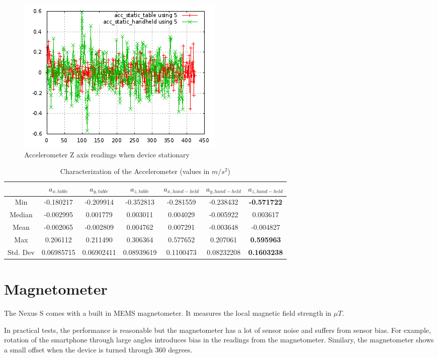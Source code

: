 \begin{figure}\centering
    \includegraphics{figures/accel_static.png}
    \caption{Accelerometer Z axis readings when device stationary\label{fig:accel_static}}
\end{figure}

\begin{table}
\centering
\begin{tabular}{c c c c c c c}
\hline
\hline
 & $a_{x,table}$ & $a_{y,table}$ & $a_{z,table}$ & $a_{x,hand-held}$ & $a_{y,hand-held}$ & $a_{z,hand-held}$ \\
\hline
Min & -0.180217 & -0.209914 & -0.352813 & -0.281559 & -0.238432 & \textbf{-0.571722} \\
Median & -0.002995 & 0.001779 & 0.003011 & 0.004029 & -0.005922 & 0.003617 \\
Mean & -0.002065 & -0.002809 & 0.004762 & 0.007291 & -0.003648 & -0.004827 \\
Max & 0.206112 & 0.211490 & 0.306364 & 0.577652 & 0.207061 & \textbf{0.595963} \\
Std. Dev & 0.06985715 & 0.06902411 & 0.08939619 & 0.1100473 & 0.08232208 & \textbf{0.1603238} \\
\hline
\end{tabular}
\caption{Characterization of the Accelerometer (values in $m/s^2$)\label{tbl:accel_chars}}
\end{table}


\section{Magnetometer}

The Nexus S comes with a built in MEMS magnetometer.
It measures the local magnetic field strength in $\mu T$.

In practical tests, the performance is reasonable but the magnetometer has a 
lot of sensor noise and suffers from sensor bias. For example, rotation of 
the smartphone through large angles introduces bias in the readings from the 
magnetometer. Similary, the magnetometer shows a small offset when the device is 
turned through 360 degrees.

